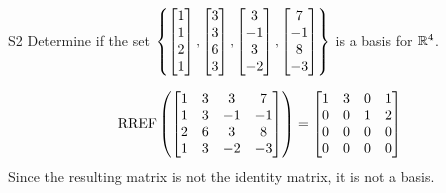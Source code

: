 \begin{problem}{S2}
Determine if the set
\(\left\{
  \begin{bmatrix} 1 \\ 1 \\ 2 \\1 \end{bmatrix},
  \begin{bmatrix} 3 \\ 3 \\ 6 \\ 3 \end{bmatrix},
  \begin{bmatrix}3 \\ -1 \\ 3 \\ -2\end{bmatrix},
  \begin{bmatrix} 7 \\ -1 \\ 8 \\ -3 \end{bmatrix}
\right\}\) is a basis for \(\mathbb{R}^4\).
\end{problem}
\begin{solution}
\[\operatorname{RREF}\left(\begin{bmatrix} 1 & 3 & 3 & 7 \\ 1 & 3 & -1 & -1 \\ 2 & 6 & 3 & 8 \\ 1 & 3 & -2 & -3 \end{bmatrix}\right) = \begin{bmatrix} 1 & 3 & 0 & 1 \\ 0 & 0 & 1 & 2 \\ 0 & 0 & 0 & 0 \\ 0 & 0 & 0 & 0  \end{bmatrix}\]
Since the resulting matrix is not the identity matrix, it is not a basis.
\end{solution}

